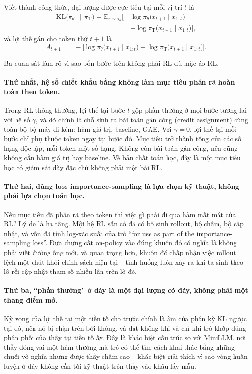 Viết thành công thức, đại lượng được cực tiểu tại mỗi vị trí $t$ là
\[
\begin{aligned}
\mathrm{KL}\big(\pi_\theta \,\big\|\, \pi_{\mathrm{T}}\big)
= \mathbb{E}_{x\sim\pi_\theta}\Big[\,&\log \pi_\theta\big(x_{t+1}\mid x_{1:t}\big) \\
 &- \log \pi_{\mathrm{T}}\big(x_{t+1}\mid x_{1:t}\big)\Big],
\end{aligned}
\]
và lợi thế gán cho token thứ $t+1$ là
\[
A_{t+1} \;=\; -\Big[\log \pi_\theta\big(x_{t+1}\mid x_{1:t}\big) - \log \pi_{\mathrm{T}}\big(x_{t+1}\mid x_{1:t}\big)\Big].
\]

Ba quan sát làm rõ vì sao bốn bước trên không phải RL dù mặc áo RL.

\paragraph{Thứ nhất, hệ số chiết khấu bằng không làm mục tiêu phân rã hoàn toàn theo token.} Trong RL thông thường, lợi thế tại bước $t$ gộp phần thưởng ở mọi bước tương lai với hệ số $\gamma$, và đó chính là chỗ sinh ra bài toán gán công (credit assignment) cùng toàn bộ bộ máy đi kèm: hàm giá trị, baseline, GAE. Với $\gamma = 0$, lợi thế tại mỗi bước chỉ phụ thuộc token ngay tại bước đó. Mục tiêu trở thành tổng của các số hạng độc lập, mỗi token một số hạng. Không còn bài toán gán công, nên cũng không cần hàm giá trị hay baseline. Về bản chất toán học, đây là một mục tiêu học có giám sát dày đặc chứ không phải một bài RL.

\paragraph{Thứ hai, dùng loss importance-sampling là lựa chọn kỹ thuật, không phải lựa chọn toán học.} Nếu mục tiêu đã phân rã theo token thì việc gì phải đi qua hàm mất mát của RL? Lý do là hạ tầng. Một hệ RL sẵn có đã có bộ sinh rollout, bộ chấm, bộ cập nhật, và vốn đã tính log-xác suất của trò ``for use as part of the importance-sampling loss''. Đưa chưng cất on-policy vào đúng khuôn đó có nghĩa là không phải viết đường ống mới, và quan trọng hơn, khuôn đó chấp nhận việc rollout lệch một chút khỏi chính sách hiện tại -- tình huống luôn xảy ra khi ta sinh theo lô rồi cập nhật tham số nhiều lần trên lô đó.

\paragraph{Thứ ba, ``phần thưởng'' ở đây là một đại lượng có đáy, không phải một thang điểm mở.} Kỳ vọng của lợi thế tại một tiền tố cho trước chính là âm của phân kỳ KL ngược tại đó, nên nó bị chặn trên bởi không, và đạt không khi và chỉ khi trò khớp đúng phân phối của thầy tại tiền tố ấy. Đây là khác biệt cấu trúc so với MiniLLM, nơi thầy đóng vai một hàm thưởng mà trò có thể tìm cách khai thác bằng những chuỗi vô nghĩa nhưng được thầy chấm cao -- khác biệt giải thích vì sao vòng huấn luyện ở đây không cần tới kỹ thuật trộn thầy vào khâu lấy mẫu.

